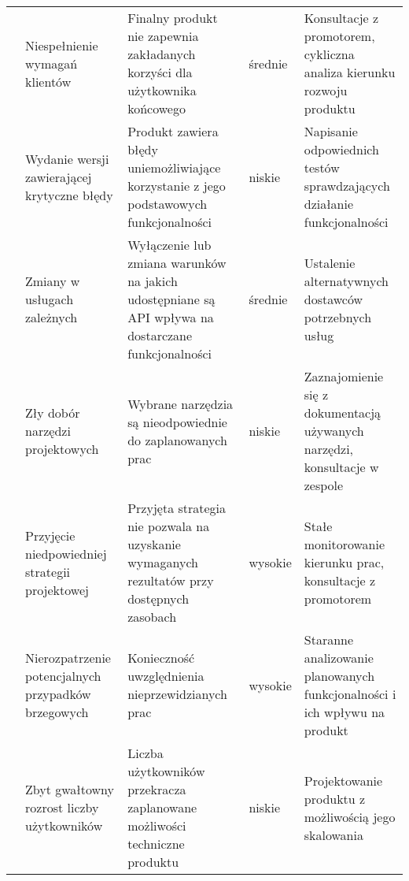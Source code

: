 \begin{longtable}{|p{.1\linewidth}|p{}|p{}|p{}|p{}|}
     & Niespełnienie wymagań klientów & Finalny produkt nie zapewnia zakładanych korzyści dla użytkownika końcowego & średnie
     & Konsultacje z promotorem, cykliczna analiza kierunku rozwoju produktu \\
     \cline{2-5}
     & Wydanie wersji zawierającej krytyczne błędy & Produkt zawiera błędy uniemożliwiające korzystanie z jego podstawowych funkcjonalności & niskie
     & Napisanie odpowiednich testów sprawdzających działanie funkcjonalności \\
     \cline{2-5}
     & Zmiany w usługach zależnych & Wyłączenie lub zmiana warunków na jakich udostępniane są API wpływa na dostarczane funkcjonalności & średnie
     & Ustalenie alternatywnych dostawców potrzebnych usług \\
     \cline{2-5}
     & Zły dobór narzędzi projektowych & Wybrane narzędzia są nieodpowiednie do zaplanowanych prac & niskie
     & Zaznajomienie się z dokumentacją używanych narzędzi, konsultacje w zespole \\
    \hline
    \multirow{2}{=}{\parbox[c]{3.5cm}{}} & Przyjęcie niedpowiedniej strategii projektowej & Przyjęta strategia nie pozwala na uzyskanie wymaganych rezultatów przy dostępnych zasobach & wysokie
     & Stałe monitorowanie kierunku prac, konsultacje z promotorem \\
     \cline{2-5}
     & Nierozpatrzenie potencjalnych przypadków brzegowych & Konieczność uwzględnienia nieprzewidzianych prac & wysokie
     & Staranne analizowanie planowanych funkcjonalności i ich wpływu na produkt \\
     \hline
     \multirow{1}{=}{\parbox[c]{2cm}{}}& Zbyt gwałtowny rozrost liczby użytkowników & Liczba użytkowników przekracza zaplanowane możliwości techniczne produktu & niskie
     & Projektowanie produktu z możliwością jego skalowania \\
    \hline

\end{longtable}
\pagebreak


